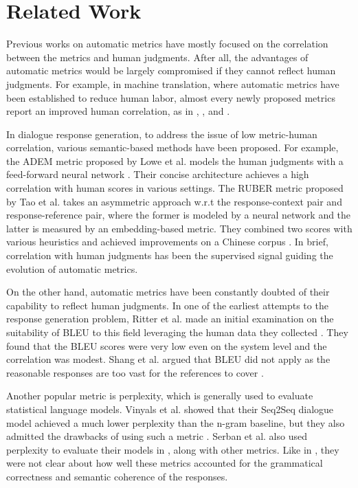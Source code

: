 \documentclass[runningheads]{llncs}
\begin{document}
    \section{Related Work}
    Previous works on automatic metrics have mostly focused on the correlation between the metrics and human judgments. After all, the advantages of automatic metrics would be largely compromised if they cannot reflect human judgments. For example, in machine translation, where automatic metrics have been established to reduce human labor, almost every newly proposed metrics report an improved human correlation, as in \cite{NIST}, \cite{METEOR}, and \cite{chrf}.

    In dialogue response generation, to address the issue of low metric-human correlation, various semantic-based methods have been proposed. For example, the ADEM metric proposed by Lowe et al. models the human judgments with a feed-forward neural network \cite{ADEM}. Their concise architecture achieves a high correlation with human scores in various settings. The RUBER metric proposed by Tao et al. takes an asymmetric approach w.r.t the response-context pair and response-reference pair, where the former is modeled by a neural network and the latter is measured by an embedding-based metric. They combined two scores with various heuristics and achieved improvements on a Chinese corpus \cite{RUBER}. In brief, correlation with human judgments has been the supervised signal guiding the evolution of automatic metrics.

    On the other hand, automatic metrics have been constantly doubted of their capability to reflect human judgments. In one of the earliest attempts to the response generation problem, Ritter et al. made an initial examination on the suitability of BLEU to this field leveraging the human data they collected \cite{Ritter11}. They found that the BLEU scores were very low even on the system level and the correlation was modest. Shang et al. argued that BLEU did not apply as the reasonable responses are too vast for the references to cover \cite{Shang}.

    Another popular metric is perplexity, which is generally used to evaluate statistical language models. Vinyals et al. showed that their Seq2Seq dialogue model achieved a much lower perplexity than the n-gram baseline, but they also admitted the drawbacks of using such a metric \cite{GoogleChatbot}. Serban et al. also used perplexity to evaluate their models in \cite{HRED}, along with other metrics. Like in \cite{GoogleChatbot}, they were not clear about how well these metrics accounted for the grammatical correctness and semantic coherence of the responses.
\end{document}
